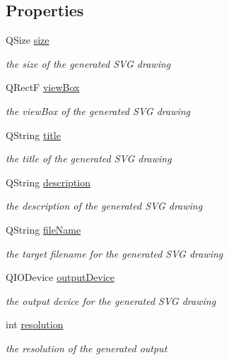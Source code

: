 \subsection*{Properties}
\begin{DoxyCompactItemize}
\item 
Q\+Size \hyperlink{class_svg_generator_acc6cf7b4596fb1c19ce95d45aac00124}{size}
\begin{DoxyCompactList}\small\item\em the size of the generated S\+VG drawing \end{DoxyCompactList}\item 
Q\+RectF \hyperlink{class_svg_generator_a4a56c80b10833a8ded8715652d67afe2}{view\+Box}
\begin{DoxyCompactList}\small\item\em the view\+Box of the generated S\+VG drawing \end{DoxyCompactList}\item 
Q\+String \hyperlink{class_svg_generator_abe9c2cd9446061e16cfdea2fa7eb777d}{title}
\begin{DoxyCompactList}\small\item\em the title of the generated S\+VG drawing \end{DoxyCompactList}\item 
Q\+String \hyperlink{class_svg_generator_ad59f1e13a42ee64b2d354f29a5255cea}{description}
\begin{DoxyCompactList}\small\item\em the description of the generated S\+VG drawing \end{DoxyCompactList}\item 
Q\+String \hyperlink{class_svg_generator_a4f72398a28e315c9192a611e16f8b693}{file\+Name}
\begin{DoxyCompactList}\small\item\em the target filename for the generated S\+VG drawing \end{DoxyCompactList}\item 
Q\+I\+O\+Device \hyperlink{class_svg_generator_aa03e26c21b02f54f2e318633db8496de}{output\+Device}
\begin{DoxyCompactList}\small\item\em the output device for the generated S\+VG drawing \end{DoxyCompactList}\item 
int \hyperlink{class_svg_generator_a3d8c9548b882f99b74b011e965b01a2e}{resolution}
\begin{DoxyCompactList}\small\item\em the resolution of the generated output \end{DoxyCompactList}\end{DoxyCompactItemize}


